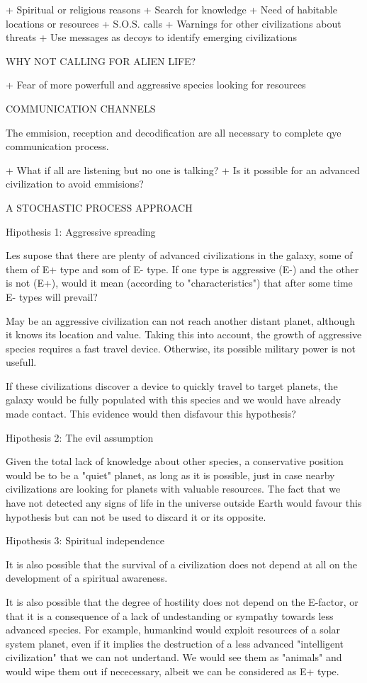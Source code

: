 + Spiritual or religious reasons
+ Search for knowledge
+ Need of habitable locations or resources
+ S.O.S. calls
+ Warnings for other civilizations about threats
+ Use messages as decoys to identify emerging civilizations


WHY NOT CALLING FOR ALIEN LIFE?

+ Fear of more powerfull and aggressive species looking for resources

COMMUNICATION CHANNELS

The emmision, reception and decodification are all necessary to complete qye
communication process.

+ What if all are listening but no one is talking?
+ Is it possible for an advanced civilization to avoid emmisions?


A STOCHASTIC PROCESS APPROACH

Hipothesis 1:  Aggressive spreading

Les supose that there are plenty of advanced civilizations in the
galaxy, some of them of E+ type and som of E- type.  If one type is
aggressive (E-) and the other is not (E+), would it mean (according to
"characteristics") that after some time E- types will prevail?

May be an aggressive civilization can not reach another distant
planet, although it knows its location and value.   Taking this into
account, the growth of aggressive species requires a fast travel
device.  Otherwise, its possible military power is not usefull.

If these civilizations discover a device to quickly travel to target
planets, the galaxy would be fully populated with this species and we
would have already made contact.   This evidence would then disfavour
this hypothesis?

Hipothesis 2:  The evil assumption

Given the total lack of knowledge about other species, a conservative
position would be to be a "quiet" planet, as long as it is possible,
just in case nearby civilizations are looking for planets with
valuable resources.   The fact that we have not detected any signs of
life in the universe outside Earth would favour this hypothesis but
can not be used to discard it or its opposite.

Hipothesis 3:  Spiritual independence

It is also possible that the survival of a civilization does not
depend at all on the development of a spiritual awareness.

It is also possible that the degree of hostility does not depend on
the E-factor, or that it is a consequence of a lack of undestanding or
sympathy towards less advanced species.  For example, humankind would
exploit resources of a solar system planet, even if it implies the
destruction of a less advanced "intelligent civilization" that we can
not undertand.  We would see them as "animals" and would wipe them out
if nececessary, albeit we can be considered as E+ type.


